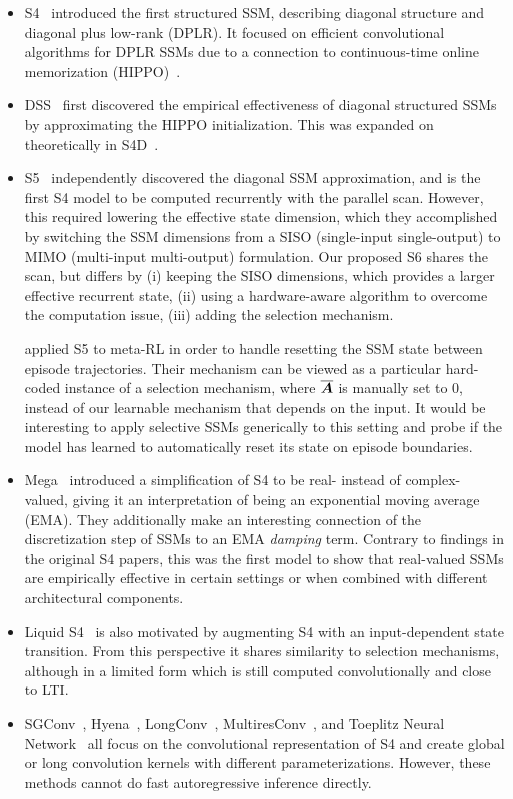 \begin{itemize}[leftmargin=*,itemsep=0pt,topsep=0pt]
  \item S4~\citep{gu2021combining,gu2022efficiently} introduced the first structured SSM, describing diagonal structure and diagonal plus low-rank (DPLR). It focused on efficient convolutional algorithms for DPLR SSMs due to a connection to continuous-time online memorization (HIPPO)~\citep{gu2020hippo}.
  \item DSS~\citep{gupta2022diagonal} first discovered the empirical effectiveness of diagonal structured SSMs by approximating the HIPPO initialization. This was expanded on theoretically in S4D~\citep{gu2022parameterization}.
  \item S5~\citep{smith2023s5} independently discovered the diagonal SSM approximation, and is the first S4 model to be computed recurrently with the parallel scan. However, this required lowering the effective state dimension, which they accomplished by switching the SSM dimensions from a SISO (single-input single-output) to MIMO (multi-input multi-output) formulation.
    Our proposed S6 shares the scan, but differs by (i) keeping the SISO dimensions, which provides a larger effective recurrent state, (ii) using a hardware-aware algorithm to overcome the computation issue, (iii) adding the selection mechanism.

    \citet{lu2023structured} applied S5 to meta-RL in order to handle resetting the SSM state between episode trajectories.
    Their mechanism can be viewed as a particular hard-coded instance of a selection mechanism,
    where $\overline{\bm{A}}$ is manually set to $0$, instead of our learnable mechanism that depends on the input.
    It would be interesting to apply selective SSMs generically to this setting and probe if the model has learned to automatically reset its state on episode boundaries.
  \item Mega~\citep{ma2023mega} introduced a simplification of S4 to be real- instead of complex- valued, giving it an interpretation of being an exponential moving average (EMA).
    They additionally make an interesting connection of the discretization step of SSMs to an EMA \emph{damping} term.
    Contrary to findings in the original S4 papers, this was the first model to show that real-valued SSMs are empirically effective in certain settings or when combined with different architectural components.
  \item Liquid S4~\citep{hasani2023liquid} is also motivated by augmenting S4 with an input-dependent state transition. From this perspective it shares similarity to selection mechanisms, although in a limited form which is still computed convolutionally and close to LTI.
  \item SGConv~\citep{li2023makes}, Hyena~\citep{poli2023hyena}, LongConv~\citep{fu2023simple}, MultiresConv~\citep{shi2023sequence}, and Toeplitz Neural Network~\citep{qin2023toeplitz} all focus on the convolutional representation of S4 and create global or long convolution kernels with different parameterizations. However, these methods cannot do fast autoregressive inference directly.
\end{itemize}


